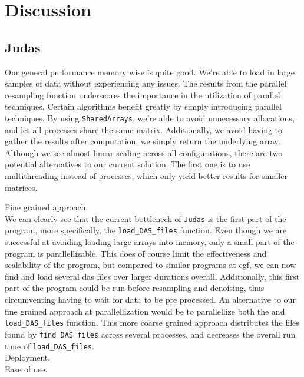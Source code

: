 \section{Discussion}
\label{chap:discussion}

\subsection{Judas}

Our general performance memory wise is quite good. We're able to load in large samples of data without experiencing any issues.
The results from the parallel resampling function underscores the importance in the utilization of parallel techniques. Certain algorithms benefit greatly by simply introducing parallel techniques. By using \texttt{SharedArrays}, we're able to avoid unnecessary allocations, and let all processes share the same matrix. Additionally, we avoid having to gather the results after computation, we simply return the underlying array. Although we see almost linear scaling across all configurations, there are two potential alternatives to our current solution. The first one is to use multithreading instead of processes, which only yield better results for smaller matrices.

Fine grained approach. \\

We can clearly see that the current bottleneck of \texttt{Judas} is the first part of the program, more specifically, the \texttt{load\_DAS\_files} function. Even though we are successful at avoiding loading large arrays into memory, only a small part of the program is parallellizable. This does of course limit the effectiveness and scalability of the program, but compared to similar programs at \acrshort{cgf}, we can now find and load several \acrshort{das} files over larger durations overall. Additionally, this first part of the program could be run before resampling and denoising, thus circumventing having to wait for data to be pre processed. An alternative to our fine grained approach at parallellization would be to parallellize both the and \texttt{load\_DAS\_files} function. This more coarse grained approach distributes the files found by \texttt{find\_DAS\_files} across several processes, and decreases the overall run time of \texttt{load\_DAS\_files}. \\

Deployment. \\ 

Ease of use. \\ 
 

